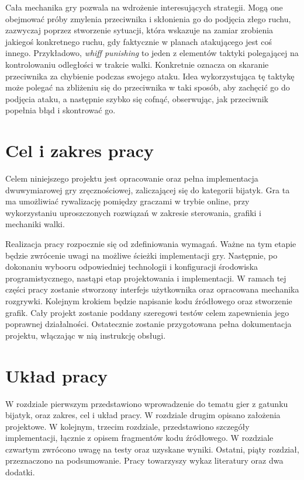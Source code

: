 Cała mechanika gry pozwala na wdrożenie interesujących strategii. Mogą one obejmować próby zmylenia przeciwnika i skłonienia go do podjęcia złego ruchu, zazwyczaj poprzez stworzenie sytuacji, która wskazuje na zamiar zrobienia jakiegoś konkretnego ruchu, gdy faktycznie w planach atakującego jest coś innego. Przykładowo, \emph{whiff punishing} to jeden z elementów taktyki polegającej na kontrolowaniu odległości w trakcie walki. Konkretnie oznacza on skaranie przeciwnika za chybienie podczas swojego ataku. Idea wykorzystująca tę taktykę może polegać na zbliżeniu się do przeciwnika w taki sposób, aby zachęcić go do podjęcia ataku, a następnie szybko się cofnąć, obserwując, jak przeciwnik popełnia błąd i skontrować go. 



\section{Cel i zakres pracy}
Celem niniejszego projektu jest opracowanie oraz pełna implementacja dwuwymiarowej gry zręcznościowej, zaliczającej się do kategorii bijatyk. Gra ta ma umożliwiać rywalizację pomiędzy graczami w trybie online, przy wykorzystaniu uproszczonych rozwiązań w zakresie sterowania, grafiki i mechaniki walki.

Realizacja pracy rozpocznie się od zdefiniowania wymagań. Ważne na tym etapie będzie zwrócenie uwagi na możliwe ścieżki implementacji gry. Następnie, po dokonaniu wybooru odpowiedniej technologii i konfiguracji środowiska programistycznego, nastąpi etap projektowania i implementacji. W ramach tej części pracy zostanie stworzony interfejs użytkownika oraz opracowana mechanika rozgrywki. Kolejnym krokiem będzie napisanie kodu źródłowego oraz stworzenie grafik. Cały projekt zostanie poddany szeregowi testów celem zapewnienia jego poprawnej działalności. Ostatecznie zostanie przygotowana pełna dokumentacja projektu, włączając w nią instrukcję obsługi.

\section{Układ pracy}
W rozdziale pierwszym przedstawiono wprowadzenie do tematu gier z gatunku bijatyk, oraz zakres, cel i układ pracy.
W rozdziale drugim opisano założenia projektowe.
W kolejnym, trzecim rozdziale, przedstawiono szczegóły implementacji, łącznie z opisem fragmentów kodu źródłowego.
W rozdziale czwartym zwrócono uwagę na testy oraz uzyskane wyniki.
Ostatni, piąty rozdział, przeznaczono na podsumowanie.
Pracy towarzyszy wykaz literatury oraz dwa dodatki. 

